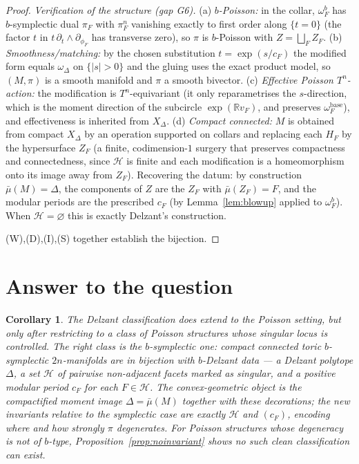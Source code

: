 \documentclass{amsart}
\newtheorem{corollary}{Corollary}
\theoremstyle{definition}
\begin{document}
\begin{proof}
\emph{Verification of the structure (gap G6).} (a) \emph{$b$-Poisson:} in the
collar, $\omega_F^b$ has $b$-symplectic dual $\pi_F$ with $\pi_F^n$ vanishing
exactly to first order along $\{t=0\}$ (the factor $t$ in $t\,\partial_t\wedge
\partial_{\phi_F}$ has transverse zero), so $\pi$ is $b$-Poisson with $Z=
\bigsqcup_F Z_F$. (b) \emph{Smoothness/matching:} by the chosen substitution
$t=\exp(s/c_F)$ the modified form equals $\omega_\Delta$ on $\{|s|>0\}$ and the
gluing uses the exact product model, so $(M,\pi)$ is a smooth manifold and
$\pi$ a smooth bivector. (c) \emph{Effective Poisson $T^n$-action:} the
modification is $T^n$-equivariant (it only reparametrises the $s$-direction,
which is the moment direction of the subcircle $\exp(\mathbb R v_F)$, and
preserves $\omega_F^{\mathrm{base}}$), and effectiveness is inherited from
$X_\Delta$. (d) \emph{Compact connected:} $M$ is obtained from compact
$X_\Delta$ by an operation supported on collars and replacing each $H_F$ by the
hypersurface $Z_F$ (a finite, codimension-$1$ surgery that preserves
compactness and connectedness, since $\mathcal H$ is finite and each
modification is a homeomorphism onto its image away from $Z_F$). Recovering the
datum: by construction $\bar\mu(M)=\Delta$, the components of $Z$ are the
$Z_F$ with $\bar\mu(Z_F)=F$, and the modular periods are the prescribed $c_F$
(by Lemma~\ref{lem:blowup} applied to $\omega_F^b$). When $\mathcal H=
\varnothing$ this is exactly Delzant's construction.

\medskip
(W),(D),(I),(S) together establish the bijection.
\end{proof}

\section{Answer to the question}

\begin{corollary}
The Delzant classification \emph{does} extend to the Poisson setting, but only
after restricting to a class of Poisson structures whose singular locus is
controlled. The right class is the $b$-symplectic one: compact connected toric
$b$-symplectic $2n$-manifolds are in bijection with $b$-Delzant data --- a
Delzant polytope $\Delta$, a set $\mathcal H$ of pairwise non-adjacent facets
marked as singular, and a positive modular period $c_F$ for each $F\in\mathcal
H$. The convex-geometric object is the compactified moment image $\Delta=
\bar\mu(M)$ together with these decorations; the new invariants relative to the
symplectic case are exactly $\mathcal H$ and $(c_F)$, encoding where and how
strongly $\pi$ degenerates. For Poisson structures whose degeneracy is \emph{not}
of $b$-type, Proposition~\ref{prop:noinvariant} shows no such clean
classification can exist.
\end{corollary}
\end{document}
